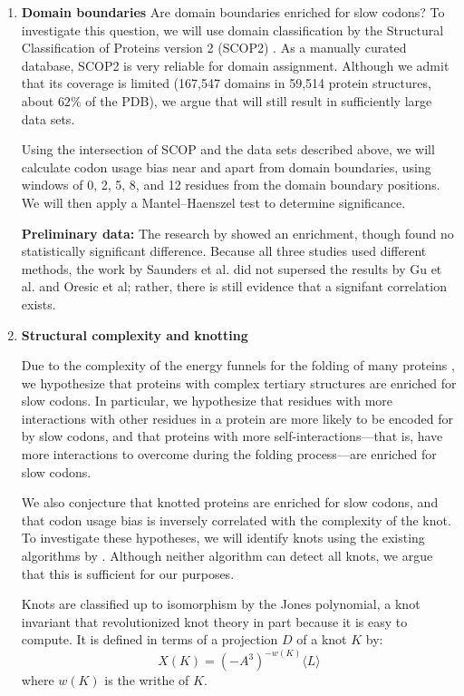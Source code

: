 \documentclass[11pt]{nih}
\begin{document}
\begin{enumerate}
\item \textbf{Domain boundaries}
Are domain boundaries enriched for slow codons?
To investigate this question, we will use domain classification by the Structural Classification of Proteins version 2 (SCOP2) \citep{Andreeva2013,scop}. As a manually curated database, SCOP2 is very reliable for domain assignment. Although we admit that its coverage is limited (167,547 domains in 59,514 protein structures, about $62\%$ of the PDB), we argue that will still result in sufficiently large data sets.

Using the intersection of SCOP and the data sets described above, we will calculate codon usage bias near and apart from domain boundaries, using windows of 0, 2, 5, 8, and 12 residues from the domain boundary positions. We will then apply a Mantel--Haenszel test to determine significance.

\textbf{Preliminary data:} The research by \citet{Gu2004,Oresic2003} showed an enrichment, though \citet{Saunders2010} found no statistically significant difference. Because all three studies used different methods, the work by Saunders et al. did not supersed the results by Gu et al. and Oresic et al; rather, there is still evidence that a signifant correlation exists.

\item \textbf{Structural complexity and knotting}

Due to the complexity of the energy funnels for the folding of many proteins \citep{bryngelson1995funnels,Onuchic2004}, we hypothesize that proteins with complex tertiary structures are enriched for slow codons. In particular, we hypothesize that residues with more interactions with other residues in a protein are more likely to be encoded for by slow codons, and that proteins with more self-interactions---that is, have more interactions to overcome during the folding process---are enriched for slow codons.

We also conjecture that knotted proteins are enriched for slow codons, and that codon usage bias is inversely correlated with the complexity of the knot. To investigate these hypotheses, we will identify knots using the existing algorithms by \citet{Lai2012,Virnau2006}. Although neither algorithm can detect all knots, we argue that this is sufficient for our purposes.

Knots are classified up to isomorphism by the Jones polynomial, a knot invariant that revolutionized knot theory in part because it is easy to compute. It is defined in terms of a projection $D$ of a knot $K$ by:\\
\begin{equation}
X(K) = (-A^3)^{-w(K)}\langle L \rangle
\end{equation}
where $w(K)$ is the writhe of $K$.


\end{enumerate}
\end{document}
